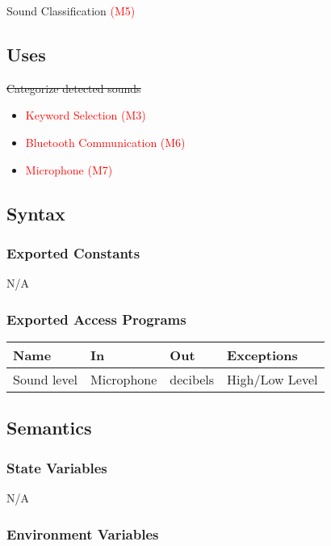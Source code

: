 \documentclass[12pt, titlepage]{article}
\begin{document}
Sound Classification \textcolor{red}{(M5)}

\subsection{Uses}
\sout{Categorize detected sounds} 
\begin{itemize}
  \item \textcolor{red}{Keyword Selection (M3)}
  \item \textcolor{red}{Bluetooth Communication (M6)}
  \item \textcolor{red}{Microphone (M7)}
  \end{itemize}
\subsection{Syntax}

\subsubsection{Exported Constants}

N/A

\subsubsection{Exported Access Programs}

\begin{center}
\begin{tabular}{p{2cm} p{4cm} p{4cm} p{2cm}}
\hline
\textbf{Name} & \textbf{In} & \textbf{Out} & \textbf{Exceptions} \\
\hline
Sound level & Microphone & decibels & High/Low Level \\
\hline
\end{tabular}
\end{center}

\subsection{Semantics}

\subsubsection{State Variables}

N/A

\subsubsection{Environment Variables}
\end{document}
